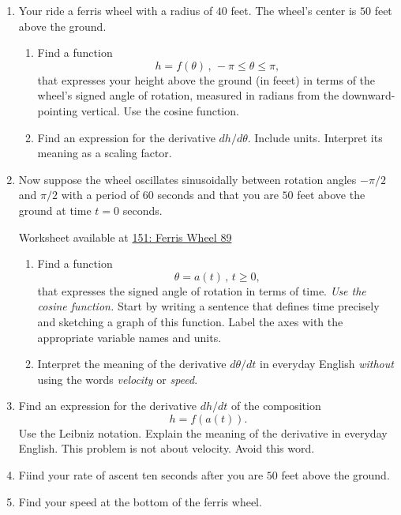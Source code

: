\documentclass{ximera}
\begin{document}
\begin{question} \label{Qw3ffem}
\begin{enumerate}
\item Your ride a ferris wheel with a radius of $40$ feet. The wheel's center is $50$ feet above the ground.

\begin{enumerate}
\item Find a function 
\[
     h = f(\theta) \, , \, -\pi \leq \theta \leq \pi ,
\]
that expresses your height above the ground (in feeet) in terms of the wheel's signed angle of rotation, measured in radians from the downward-pointing vertical. Use the cosine function.

\item Find an expression for the derivative $dh/d\theta$. Include units. Interpret its meaning as a scaling factor.
\end{enumerate}

\item Now suppose the wheel oscillates sinusoidally between rotation angles $-\pi/2$ and $\pi/2$ with a period of $60$ seconds and that you are $50$ feet above the ground at time $t=0$ seconds.


\begin{onlineOnly}
    \begin{center}
\end{center}
\end{onlineOnly}

Worksheet available at \href{https://www.desmos.com/calculator/ob9jxby6v6}{151: Ferris Wheel 89}  

\begin{enumerate}
\item Find a function
\[
  \theta = a(t) \, , \, t\geq 0,
\]
that expresses the signed angle of rotation in terms of time. \emph{Use the cosine function.} Start by writing a sentence that defines time precisely and sketching a graph of this function. Label the axes with the appropriate variable names and units.

\item Interpret the meaning of the derivative $d\theta/dt$ in everyday English \emph{without} using the words \emph{velocity} or \emph{speed}.

\end{enumerate}

\item Find an expression for the derivative $dh/dt$ of the composition
\[
  h = f(a(t)) .
\]
Use the Leibniz notation. Explain the meaning of the derivative in everyday English. This problem is not about velocity. Avoid this word.

\item Fiind your rate of ascent ten seconds after you are $50$ feet above the ground.

\item Find your speed at the bottom of the ferris wheel. 

\end{enumerate}
\end{question}
\end{document}
